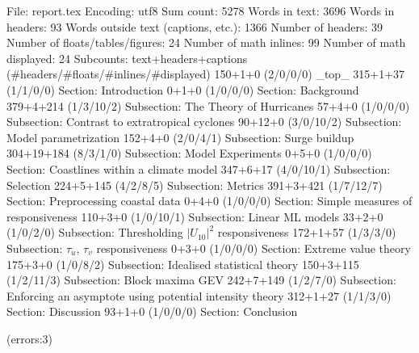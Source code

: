 
File: report.tex
Encoding: utf8
Sum count: 5278
Words in text: 3696
Words in headers: 93
Words outside text (captions, etc.): 1366
Number of headers: 39
Number of floats/tables/figures: 24
Number of math inlines: 99
Number of math displayed: 24
Subcounts:
  text+headers+captions (#headers/#floats/#inlines/#displayed)
  150+1+0 (2/0/0/0) _top_
  315+1+37 (1/1/0/0) Section: Introduction
  0+1+0 (1/0/0/0) Section: Background
  379+4+214 (1/3/10/2) Subsection: The Theory of Hurricanes
  57+4+0 (1/0/0/0) Subsection: Contrast to extratropical cyclones
  90+12+0 (3/0/10/2) Subsection: Model parametrization
  152+4+0 (2/0/4/1) Subsection: Surge buildup
  304+19+184 (8/3/1/0) Subsection: Model Experiments
  0+5+0 (1/0/0/0) Section: Coastlines within a climate model
  347+6+17 (4/0/10/1) Subsection: Selection
  224+5+145 (4/2/8/5) Subsection: Metrics
  391+3+421 (1/7/12/7) Section: Preprocessing coastal data
  0+4+0 (1/0/0/0) Section: Simple measures of responsiveness
  110+3+0 (1/0/10/1) Subsection: Linear ML models
  33+2+0 (1/0/2/0) Subsection: Thresholding $|U_{10}|^2$ responsiveness
  172+1+57 (1/3/3/0) Subsection: $\tau_u$, $\tau_v$ responsiveness
  0+3+0 (1/0/0/0) Section: Extreme value theory
  175+3+0 (1/0/8/2) Subsection: Idealised statistical theory
  150+3+115 (1/2/11/3) Subsection: Block maxima GEV
  242+7+149 (1/2/7/0) Subsection: Enforcing an asymptote using potential intensity theory 
  312+1+27 (1/1/3/0) Section: Discussion
  93+1+0 (1/0/0/0) Section: Conclusion

(errors:3)
